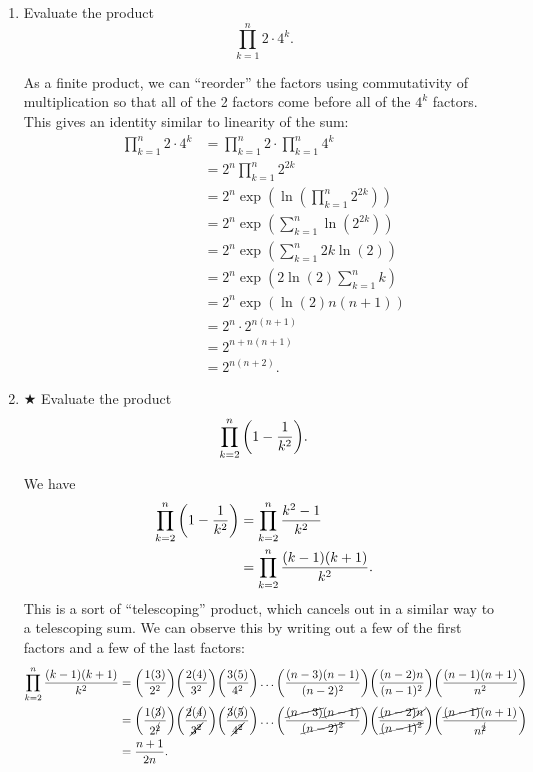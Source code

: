 \documentclass[AppendixA]{subfiles}
\begin{document}
\begin{enumerate}[leftmargin=\labelsep]
		\item Evaluate the product
		\[
			\prod_{k = 1}^n 2 \cdot 4^k.
		\]
		\begin{answer}
			As a finite product, we can ``reorder'' the factors using commutativity of multiplication so that all of the 2 factors come before all of the $4^k$ factors. This gives an identity similar to linearity of the sum:
			\begin{align*}
				\prod_{k = 1}^n 2 \cdot 4^k &= \prod_{k = 1}^n 2 \cdot \prod_{k = 1}^n 4^k\\
					&= 2^n \prod_{k = 1}^n 2^{2k}\\
					&= 2^n \exp(\ln(\prod_{k = 1}^n 2^{2k}))\\
					&= 2^n \exp(\sum_{k = 1}^n \ln(2^{2k}))\\
					&= 2^n \exp(\sum_{k = 1}^n 2k\ln(2))\\
					&= 2^n \exp(2\ln(2)\sum_{k = 1}^n k)\\
					&= 2^n \exp(\ln(2)n(n + 1))\\
					&= 2^n \cdot 2^{n(n + 1)}\\
					&= 2^{n + n(n+1)}\\
					&= 2^{n(n+2)}.
			\end{align*}
		\end{answer}
		
		\item $\bigstar$ Evaluate the product
		\[
			\prod_{k = 2}^n \qty(1 - \frac{1}{k^2}).
		\]
		\begin{answer}
			We have
			\begin{align*}
				\prod_{k = 2}^n \qty(1 - \frac{1}{k^2}) &= \prod_{k = 2}^n \frac{k^2 - 1}{k^2}\\
					&= \prod_{k = 2}^n \frac{(k - 1)(k + 1)}{k^2}.
			\end{align*}
			This is a sort of ``telescoping'' product, which cancels out in a similar way to a telescoping sum. We can observe this by writing out a few of the first factors and a few of the last factors:
			\begin{align*}
				\prod_{k = 2}^n \frac{(k - 1)(k + 1)}{k^2} &= \qty(\frac{1(3)}{2^2})\qty(\frac{2(4)}{3^2})\qty(\frac{3(5)}{4^2}) \dots \qty(\frac{(n - 3)(n - 1)}{(n - 2)^2})\qty(\frac{(n - 2)n}{(n - 1)^2})\qty(\frac{(n - 1)(n + 1)}{n^2})\\
					&= \qty(\frac{1(\cancel{3})}{2^{\cancel{2}}})\qty(\frac{\cancel{2}(\cancel{4})}{\cancel{3^2}})\qty(\frac{\cancel{3}(\cancel{5})}{\cancel{4^2}}) \dots \qty(\frac{\cancel{(n - 3)}\cancel{(n - 1)}}{\cancel{(n - 2)^2}})\qty(\frac{\cancel{(n - 2)}\cancel{n}}{\cancel{(n - 1)^2}})\qty(\frac{\cancel{(n - 1)}(n + 1)}{n^{\cancel{2}}})\\
					&= \frac{n+1}{2n}.
			\end{align*}
		\end{answer}
	\end{enumerate}
\end{document}
